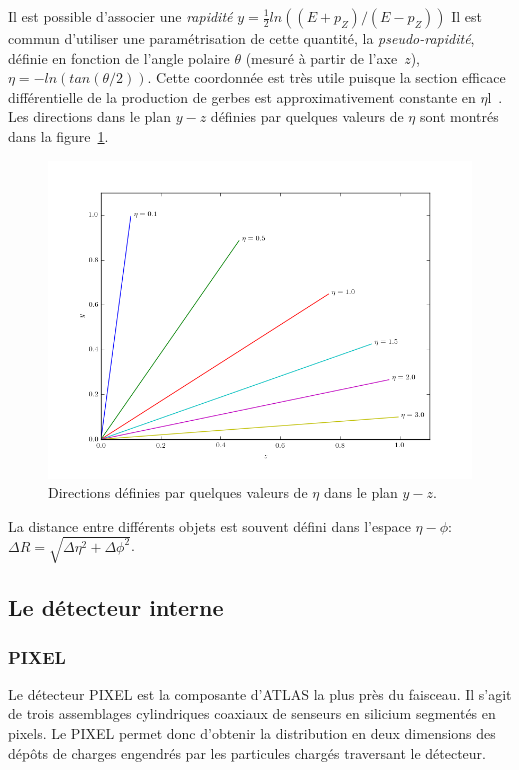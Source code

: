 Il est possible d'associer une \emph{rapidité}
$y = \frac{1}{2}ln((E + p_Z)/(E - p_Z))$ Il est commun d'utiliser une
paramétrisation de cette quantité, la \emph{pseudo-rapidité}, définie
en fonction de l'angle polaire $\theta$ (mesuré à partir de
l'axe~$z$), $\eta = -ln(tan(\theta/2))$. Cette coordonnée est très
utile puisque la section efficace différentielle de la production de
gerbes est approximativement constante en
$\eta$l~\cite{thomson_modern_2013}. Les directions dans le plan $y-z$
définies par quelques valeurs de $\eta$ sont montrés dans la
figure~\ref{fig:eta}.

\begin{figure}[h]
  \centering
  \includegraphics[width=.5\textwidth]{eta.png}
  \caption{Directions définies par quelques valeurs de $\eta$ dans le plan $y-z$.}
  \label{fig:eta}
\end{figure}

La distance entre différents objets est souvent défini dans l'espace
$\eta-\phi$: $\Delta R = \sqrt{\Delta\eta^2 + \Delta\phi^2}$.


\subsection{Le détecteur interne}
\label{sec:lhc_atlas:atlas:indet}


\subsubsection{PIXEL}

Le détecteur PIXEL est la composante d'ATLAS la plus près du
faisceau. Il s'agit de trois assemblages cylindriques coaxiaux de
senseurs en silicium segmentés en pixels. Le PIXEL permet donc
d'obtenir la distribution en deux dimensions des dépôts de charges
engendrés par les particules chargés traversant le détecteur.

